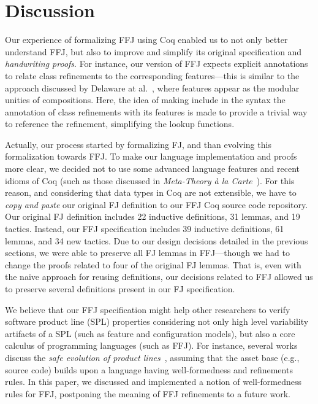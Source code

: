 \section{Discussion}\label{seq:impl}

Our experience of formalizing \ac{FFJ} 
using Coq enabled us to 
not only better understand \ac{FFJ}, but also to improve and 
simplify its original specification and \emph{handwriting 
proofs}. For instance, our version of \ac{FFJ} expects 
explicit annotations to relate class refinements to the 
corresponding features---this is similar to the 
approach discussed by Delaware at al.~\cite{delaware:fse-2009}, 
where features appear as the modular unities of compositions. 
Here, the idea of making include in the syntax the annotation 
of class refinements with its features is made to provide a trivial way to 
reference the refinement, simplifying the lookup functions.

Actually, our process started by formalizing \ac{FJ}, 
and than evolving this formalization towards \ac{FFJ}. 
To make our language implementation and proofs more clear, 
we decided not to use some advanced language features 
and recent idioms of Coq (such as those discussed in \emph{Meta-Theory \`{a} la Carte}~\cite{}). 
For this reason, and considering that data types in Coq are not extensible, 
we have to \emph{copy and paste} our original \ac{FJ} definition 
to our \ac{FFJ} Coq source code repository. Our original \ac{FJ} 
definition includes 22 inductive definitions, 31 lemmas, and 
19 tactics. Instead, our \ac{FFJ} specification includes 
39 inductive definitions, 61 lemmas, and 34 new tactics. Due to our 
design decisions detailed in the previous sections, 
we were able to preserve all \ac{FJ} lemmas in \ac{FFJ}---though 
we had to change the proofs related to four of the original \ac{FJ} 
lemmas. That is, even with the naive approach for reusing 
definitions, our decisions related to \ac{FFJ} 
allowed us to preserve several definitions present 
in our \ac{FJ} specification. 

We believe that our \ac{FFJ} specification might 
help other researchers to verify software product 
line (SPL) properties considering not only high level 
variability artifacts of a SPL (such as feature and configuration 
models), but also a core calculus of programming 
languages (such as \ac{FFJ}). For instance, 
several works discuss the \emph{safe evolution 
of product lines}~\cite{}, assuming that the asset 
base (e.g., source code) builds upon a 
language having well-formedness and 
refinements rules. In this paper, we discussed and implemented a 
notion of well-formedness rules for \ac{FFJ}, postponing 
the meaning of \ac{FFJ} refinements to a future work.  

 

